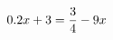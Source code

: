 \documentclass[preview]{standalone}
\begin{document}
\begin{align*}
\special{dvisvgm:raw <g id='unique000'>}0.2x + 3 = \frac{3}{4} - 9x\special{dvisvgm:raw </g>}
\end{align*}
\end{document}
